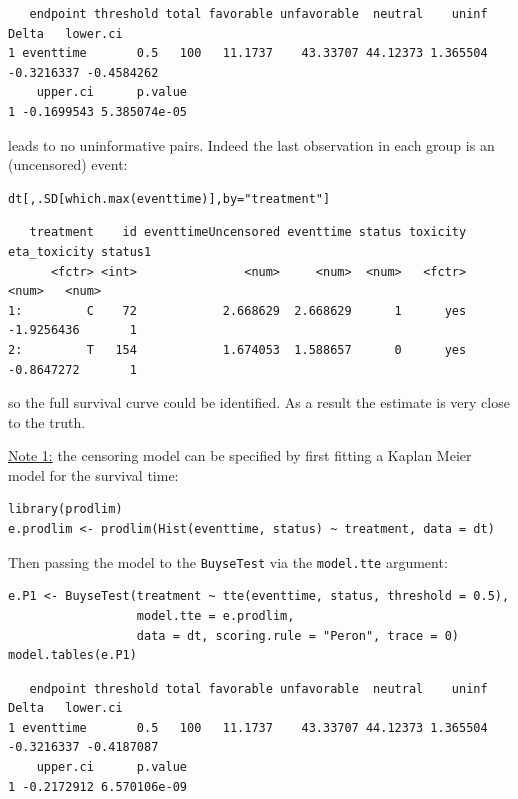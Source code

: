 \documentclass[12pt]{article}
\begin{document}
\begin{verbatim}
   endpoint threshold total favorable unfavorable  neutral    uninf      Delta   lower.ci
1 eventtime       0.5   100   11.1737    43.33707 44.12373 1.365504 -0.3216337 -0.4584262
    upper.ci      p.value
1 -0.1699543 5.385074e-05
\end{verbatim}

leads to no uninformative pairs. Indeed the last observation in each group is an (uncensored) event:
\lstset{language=r,label= ,caption= ,captionpos=b,numbers=none}
\begin{lstlisting}
dt[,.SD[which.max(eventtime)],by="treatment"]
\end{lstlisting}

\begin{verbatim}
   treatment    id eventtimeUncensored eventtime status toxicity eta_toxicity status1
      <fctr> <int>               <num>     <num>  <num>   <fctr>        <num>   <num>
1:         C    72            2.668629  2.668629      1      yes   -1.9256436       1
2:         T   154            1.674053  1.588657      0      yes   -0.8647272       1
\end{verbatim}

so the full survival curve could be identified. As a result the estimate is very close to the
truth. 

\bigskip

\uline{Note 1:} the censoring model can be specified by first fitting a
Kaplan Meier model for the survival time:
\lstset{language=r,label= ,caption= ,captionpos=b,numbers=none}
\begin{lstlisting}
library(prodlim)
e.prodlim <- prodlim(Hist(eventtime, status) ~ treatment, data = dt)
\end{lstlisting}

Then passing the model to the \texttt{BuyseTest} via the \texttt{model.tte} argument:
\lstset{language=r,label= ,caption= ,captionpos=b,numbers=none}
\begin{lstlisting}
e.P1 <- BuyseTest(treatment ~ tte(eventtime, status, threshold = 0.5),
                  model.tte = e.prodlim,
                  data = dt, scoring.rule = "Peron", trace = 0)
model.tables(e.P1)
\end{lstlisting}

\begin{verbatim}
   endpoint threshold total favorable unfavorable  neutral    uninf      Delta   lower.ci
1 eventtime       0.5   100   11.1737    43.33707 44.12373 1.365504 -0.3216337 -0.4187087
    upper.ci      p.value
1 -0.2172912 6.570106e-09
\end{verbatim}
\end{document}
